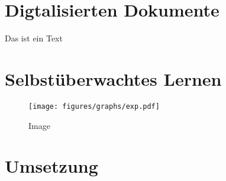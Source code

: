 \chapter{Digtalisierten Dokumente}
Das ist ein Text

\chapter{Selbstüberwachtes Lernen}

\begin{figure}
    \texttt{[image: figures/graphs/exp.pdf]} 
    \caption{Image}
  \end{figure}

\chapter{Umsetzung}
